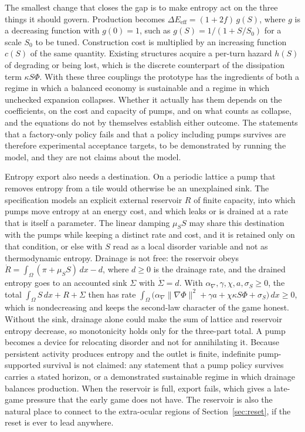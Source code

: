 \documentclass[11pt]{article}
\begin{document}
The smallest change that closes the gap is to make entropy act on the three things it should govern. Production becomes $\Delta E_{\text{eff}} = (1 + 2f)\, g(S)$, where $g$ is a decreasing function with $g(0) = 1$, such as $g(S) = 1/(1 + S/S_0)$ for a scale $S_0$ to be tuned. Construction cost is multiplied by an increasing function $c(S)$ of the same quantity. Existing structures acquire a per-turn hazard $h(S)$ of degrading or being lost, which is the discrete counterpart of the dissipation term $\kappa S \Phi$. With these three couplings the prototype has the ingredients of both a regime in which a balanced economy is sustainable and a regime in which unchecked expansion collapses. Whether it actually has them depends on the coefficients, on the cost and capacity of pumps, and on what counts as collapse, and the equations do not by themselves establish either outcome. The statements that a factory-only policy fails and that a policy including pumps survives are therefore experimental acceptance targets, to be demonstrated by running the model, and they are not claims about the model.

Entropy export also needs a destination. On a periodic lattice a pump that removes entropy from a tile would otherwise be an unexplained sink. The specification models an explicit external reservoir $R$ of finite capacity, into which pumps move entropy at an energy cost, and which leaks or is drained at a rate that is itself a parameter. The linear damping $\mu_S S$ may share this destination with the pumps while keeping a distinct rate and cost, and it is retained only on that condition, or else with $S$ read as a local disorder variable and not as thermodynamic entropy. Drainage is not free: the reservoir obeys $\dot R = \int_\Omega (\pi + \mu_S S)\,dx - d$, where $d \ge 0$ is the drainage rate, and the drained entropy goes to an accounted sink $\Sigma$ with $\dot\Sigma = d$. With $\alpha_\nabla,\gamma,\chi,a,\sigma_S \ge 0$, the total $\int_\Omega S\,dx + R + \Sigma$ then has rate $\int_\Omega\big(\alpha_\nabla\lVert\nabla\Phi\rVert^2 + \gamma a + \chi\kappa S\Phi + \sigma_S\big)\,dx \ge 0$, which is nondecreasing and keeps the second-law character of the game honest. Without the sink, drainage alone could make the sum of lattice and reservoir entropy decrease, so monotonicity holds only for the three-part total. A pump becomes a device for relocating disorder and not for annihilating it. Because persistent activity produces entropy and the outlet is finite, indefinite pump-supported survival is not claimed: any statement that a pump policy survives carries a stated horizon, or a demonstrated sustainable regime in which drainage balances production. When the reservoir is full, export fails, which gives a late-game pressure that the early game does not have. The reservoir is also the natural place to connect to the extra-ocular regions of Section~\ref{sec:reset}, if the reset is ever to lead anywhere.
\end{document}
